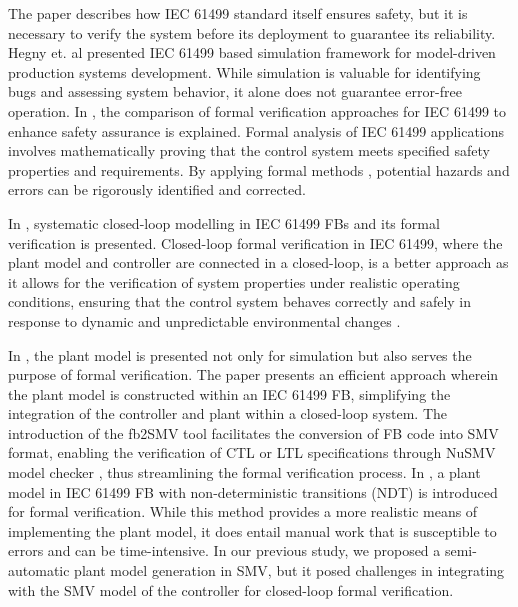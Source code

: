 \documentclass{ieeeojies}
\begin{document}
The paper \cite{vyatkin2009iec} describes how IEC 61499 standard itself ensures safety, but it is necessary to verify the system before its deployment to guarantee its reliability.  Hegny et. al \cite{hegny2010iec} presented  IEC 61499 based simulation framework for model-driven production systems development. While simulation is valuable for identifying bugs and assessing system behavior, it alone does not guarantee error-free operation. In \cite{blech2016comparison},  the comparison of formal verification approaches for IEC 61499 to enhance safety assurance is explained. Formal analysis of IEC 61499 applications \cite{cengic2010formal1, cengic2010formal2 } involves mathematically proving that the control system meets specified safety properties and requirements. By applying formal methods \cite{schnakenbourg2002towards,yoong2010modelling}, potential hazards and errors can be rigorously identified and corrected.



In \cite{ vyatkin2008closed, pang2009systematic}, systematic closed-loop modelling in IEC 61499 FBs and its  formal verification is presented. Closed-loop formal verification in IEC 61499, where the plant model and controller are connected in a closed-loop, is a better approach \cite{sinha2019survey, xavier2023formal} as it allows for the verification of system properties under realistic operating conditions, ensuring that the control system behaves correctly and safely in response to dynamic and unpredictable environmental changes \cite{ovsiannikova2023formal}.



In \cite{hanisch2009one}, the plant model is presented not only for simulation but also serves the purpose of formal verification. The paper \cite{malik2017emulation} presents an efficient approach wherein the plant model is constructed within an IEC 61499 FB, simplifying the integration of the controller and plant within a closed-loop system. The introduction of the fb2SMV tool \cite{fb2smv} facilitates the conversion of FB code into SMV format, enabling the verification of CTL or LTL specifications through NuSMV model checker \cite{cimatti2002nusmv}, thus streamlining the formal verification process. In  \cite{xavier2021cyber}, a plant model in IEC 61499 FB with non-deterministic transitions (NDT) is introduced for formal verification. While this method provides a more realistic means of implementing the plant model, it does entail manual work that is susceptible to errors and can be time-intensive. In our previous study\cite{xavier2021plant}, we proposed a semi-automatic plant model generation in SMV, but it posed challenges in integrating with the SMV model of the controller for closed-loop formal verification.
\end{document}
